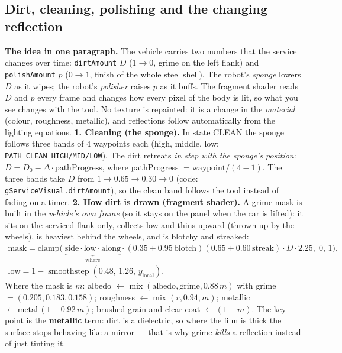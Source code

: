 \documentclass[10pt,a4paper]{article}
\newcommand{\fn}[1]{\texttt{#1}}
\begin{document}
\subsection{Dirt, cleaning, polishing and the changing reflection}\label{sec:polish}
\textbf{The idea in one paragraph.} The vehicle carries two numbers that the service changes over time: \fn{dirtAmount} $D$ ($1\to0$, grime on the left flank) and \fn{polishAmount} $p$ ($0\to1$, finish of the whole steel shell).
The robot's \emph{sponge} lowers $D$ as it wipes; the robot's \emph{polisher} raises $p$ as it buffs. The fragment shader reads $D$ and $p$ every frame and changes how every pixel of the body is lit, so what you see
changes with the tool. No texture is repainted: it is a change in the \emph{material} (colour, roughness, metallic), and reflections follow automatically from the lighting equations.
\textbf{1. Cleaning (the sponge).} In state CLEAN the sponge follows three bands of 4 waypoints each (high, middle, low; \fn{PATH\_CLEAN\_HIGH/MID/LOW}). The dirt retreats \emph{in step with the sponge's position}:
$D=D_0-\Delta\cdot\text{pathProgress}$, where pathProgress $=\text{waypoint}/(4-1)$. The three bands take $D$ from $1\to0.65\to0.30\to0$ (code: \fn{gServiceVisual.dirtAmount}), so the clean band follows the tool instead of fading on a timer.
\textbf{2. How dirt is drawn (fragment shader).} A grime mask is built in the \emph{vehicle's own frame} (so it stays on the panel when the car is lifted): it sits on the serviced flank only, collects low and thins upward
(thrown up by the wheels), is heaviest behind the wheels, and is blotchy and streaked:
\begin{equation}\begin{gathered}\text{mask}=\text{clamp}\big(\;\underbrace{\text{side}\cdot\text{low}\cdot\text{along}}_{\text{where}}\cdot(0.35+0.95\,\text{blotch})(0.65+0.60\,\text{streak})\cdot D\cdot2.25,\;0,\,1\big),\\
\text{low}=1-\operatorname{smoothstep}(0.48,\,1.26,\,y_{\text{local}}).\end{gathered}\label{eq:dirt}\end{equation}
Where the mask is $m$: albedo $\leftarrow\operatorname{mix}(\text{albedo},\text{grime},0.88\,m)$ with grime $=(0.205,0.183,0.158)$; roughness $\leftarrow\operatorname{mix}(r,0.94,m)$; metallic $\leftarrow\text{metal}\,(1-0.92\,m)$; brushed grain and clear coat $\leftarrow(1-m)$.
The key point is the \textbf{metallic} term: dirt is a dielectric, so where the film is thick the surface stops behaving like a mirror --- that is why grime \emph{kills} a reflection instead of just tinting it.
\end{document}
